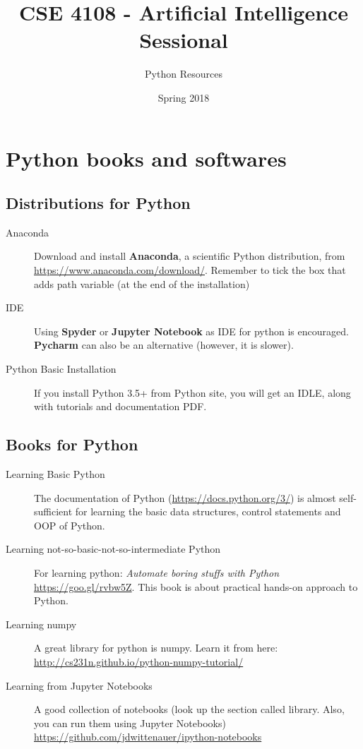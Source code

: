 \documentclass[11pt]{article}
\title{\textbf{CSE 4108 - Artificial Intelligence Sessional}}
\date{Spring 2018}
\author{Python Resources}
\begin{document}
\maketitle


\section{Python books and softwares}

\subsection{Distributions for Python}
\begin{description}
\item [Anaconda] Download and install \textbf{Anaconda}, a scientific Python distribution, from \url{https://www.anaconda.com/download/}. Remember to tick the box that adds path variable (at the end of the installation)
\item [IDE] Using \textbf{Spyder} or \textbf{Jupyter Notebook} as IDE for python is encouraged. \textbf{Pycharm} can also be an alternative (however, it is slower).
\item [Python Basic Installation] If you install Python 3.5+ from Python site, you will get an IDLE, along with tutorials and documentation PDF.
\end{description}


\subsection{Books for Python}
\begin{description}
\item [Learning Basic Python] The documentation of Python (\url{https://docs.python.org/3/}) is almost self-sufficient for learning the basic data structures, control statements and OOP of Python.

\item [Learning not-so-basic-not-so-intermediate Python] For learning python:  \textit{Automate boring stuffs with Python} \url{https://goo.gl/rvbw5Z}. This book is about practical hands-on approach to Python.

\item [Learning numpy] A great library for python is numpy. Learn it from here: \url{http://cs231n.github.io/python-numpy-tutorial/}

\item [Learning from Jupyter Notebooks]
 A good collection of notebooks (look up the section called library. Also, you can run them using Jupyter Notebooks) \url{https://github.com/jdwittenauer/ipython-notebooks}


\end{description}
\end{document}
